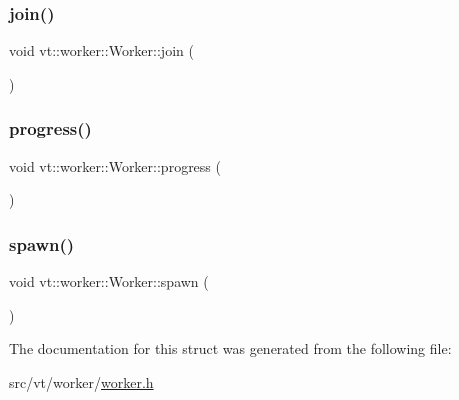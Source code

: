 \mbox{\label{structvt_1_1worker_1_1_worker_a26dfbb69a30b68c576d8836a776e54ca}} 
\subsubsection{\texorpdfstring{join()}{join()}}
{\footnotesize\ttfamily void vt\+::worker\+::\+Worker\+::join (\begin{DoxyParamCaption}{ }\end{DoxyParamCaption})}

\mbox{\label{structvt_1_1worker_1_1_worker_a4bdb22aeadc41108fd9373763f34fc1a}} 
\subsubsection{\texorpdfstring{progress()}{progress()}}
{\footnotesize\ttfamily void vt\+::worker\+::\+Worker\+::progress (\begin{DoxyParamCaption}{ }\end{DoxyParamCaption})}

\mbox{\label{structvt_1_1worker_1_1_worker_a2ecfde6febbcc08c1db88bd9936ff422}} 
\subsubsection{\texorpdfstring{spawn()}{spawn()}}
{\footnotesize\ttfamily void vt\+::worker\+::\+Worker\+::spawn (\begin{DoxyParamCaption}{ }\end{DoxyParamCaption})}



The documentation for this struct was generated from the following file\+:\begin{DoxyCompactItemize}
\item 
src/vt/worker/\hyperlink{worker_8h}{worker.\+h}\end{DoxyCompactItemize}
